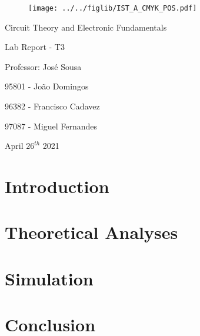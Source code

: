 \documentclass[11pt]{article}
\begin{document}
\thispagestyle{empty}
\begin{figure}[h]
	\centering
	\texttt{[image: ../../figlib/IST\_A\_CMYK\_POS.pdf]}
\end{figure}

\begin{center}
	\huge{Circuit Theory and Electronic Fundamentals}
	
	\huge{Lab Report - T3}
	
	\vspace{30pt}
	
	\large{Professor: José Sousa}
	
	\vspace{20pt}
	
	\large{95801 - João Domingos}
	
	\large{96382 - Francisco Cadavez}
	
	\large{97087 - Miguel Fernandes}
	
	\vspace{20pt}
	
	\large{April $26^{th}$ 2021}
\end{center}

\pagebreak
\tableofcontents

\pagebreak
\section{Introduction}
%

\pagebreak
\section{Theoretical Analyses}
\label{sec:theory}

\pagebreak
\section{Simulation}


\pagebreak
\section{Conclusion}
%
\end{document}
